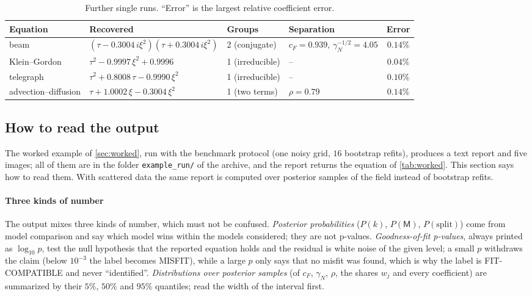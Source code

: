 \documentclass[11pt]{article}
\theoremstyle{plain}
\theoremstyle{definition}
\theoremstyle{remark}
\newcommand{\cF}{c_{F}}                     %
\newcommand{\gN}{\gamma_{N}}                %
\newcommand{\Mfit}{\mathsf{M}}              %
\newcommand{\lab}[1]{\textsf{#1}}           %
\newcommand{\FC}{\lab{FIT-COMPATIBLE}}
\newcommand{\MIS}{\lab{MISFIT}}
\begin{document}
\begin{table}[htbp]
\centering\small
\caption{Further single runs. ``Error'' is the largest relative coefficient error.}\label{sm:tab:cases}
\footnotesize
\begin{tabular}{@{}llllc@{}}
\toprule
Equation & Recovered & Groups & Separation & Error\\
\midrule
beam & $(\tau-0.3004\,i\xi^2)(\tau+0.3004\,i\xi^2)$ & 2 (conjugate) & $\cF=0.939$, $\gN^{-1/2}=4.05$ & $0.14\%$\\
Klein--Gordon & $\tau^2-0.9997\,\xi^2+0.9996$ & 1 (irreducible) & -- & $0.04\%$\\
telegraph & $\tau^2+0.8008\,\tau-0.9990\,\xi^2$ & 1 (irreducible) & -- & $0.10\%$\\
advection--diffusion & $\tau+1.0002\,\xi-0.3004\,\xi^2$ & 1 (two terms) & $\rho=0.79$ & $0.14\%$\\
\bottomrule
\end{tabular}
\end{table}

\subsection{How to read the output}\label{sm:reading}
The worked example of \cref{sec:worked}, run with the benchmark protocol (one noisy grid, $16$ bootstrap refits),
produces a text report and five images; all of them are in the folder \texttt{example\_run/} of the archive, and the
report returns the equation of \cref{tab:worked}. This section says how to read them. With scattered data the same
report is computed over posterior samples of the field instead of bootstrap refits.

\paragraph{Three kinds of number} The output mixes three kinds of number, which must not be confused.
\emph{Posterior probabilities} ($P(k)$, $P(\Mfit)$, $P(\text{split})$) come from model comparison and say which model wins
within the models considered; they are not p-values. \emph{Goodness-of-fit p-values}, always printed as $\log_{10}p$, test
the null hypothesis that the reported equation holds and the residual is white noise of the given level; a small $p$
withdraws the claim (below $10^{-3}$ the label becomes \MIS), while a large $p$ only says that no misfit was found, which
is why the label is \FC{} and never ``identified''. \emph{Distributions over posterior samples} (of $\cF$, $\gN$, $\rho$,
the shares $w_j$ and every coefficient) are summarized by their $5\%$, $50\%$ and $95\%$ quantiles; read the width of the
interval first.
\end{document}
